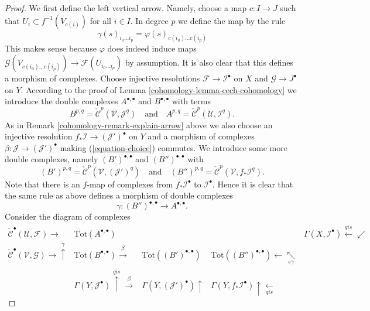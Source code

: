 \begin{proof}

We first define the left vertical arrow. Namely, choose a map
$c : I \to J$ such that $U_i \subset f^{-1}(V_{c(i)})$ for all
$i \in I$. In degree $p$ we define the map by the rule
$$
\gamma(s)_{i_0 \ldots i_p} = \varphi(s)_{c(i_0) \ldots c(i_p)}
$$
This makes sense because $\varphi$ does indeed induce maps
$\mathcal{G}(V_{c(i_0) \ldots c(i_p)}) \to \mathcal{F}(U_{i_0 \ldots i_p})$
by assumption. It is also clear that this defines a morphism of complexes.
Choose injective resolutions
$\mathcal{F} \to \mathcal{I}^\bullet$ on $X$ and
$\mathcal{G} \to J^\bullet$ on $Y$. According to
the proof of Lemma \ref{cohomology-lemma-cech-cohomology} we introduce the double
complexes $A^{\bullet, \bullet}$ and $B^{\bullet, \bullet}$
with terms
$$
B^{p, q} = \check{\mathcal{C}}^p(\mathcal{V}, \mathcal{J}^q)
\quad
\text{and}
\quad
A^{p, q} = \check{\mathcal{C}}^p(\mathcal{U}, \mathcal{I}^q).
$$
As in Remark \ref{cohomology-remark-explain-arrow} above we also choose an
injective resolution
$f_*\mathcal{I} \to (\mathcal{J}')^\bullet$ on $Y$ and a morphism
of complexes $\beta : \mathcal{J} \to (\mathcal{J}')^\bullet$
making (\ref{equation-choice}) commutes. We introduce some more
double complexes, namely $(B')^{\bullet, \bullet}$ and
$(B'')^{\bullet, \bullet}$ with
$$
(B')^{p, q} = \check{\mathcal{C}}^p(\mathcal{V}, (\mathcal{J}')^q)
\quad
\text{and}
\quad
(B'')^{p, q} = \check{\mathcal{C}}^p(\mathcal{V}, f_*\mathcal{I}^q).
$$
Note that there is an $f$-map of complexes from
$f_*\mathcal{I}^\bullet$ to $\mathcal{I}^\bullet$. Hence
it is clear that the same rule as above defines a morphism
of double complexes
$$
\gamma : (B'')^{\bullet, \bullet} \longrightarrow A^{\bullet, \bullet}.
$$
Consider the diagram of complexes
$$
\begin{array}{ccccc}\check{\mathcal{C}}^\bullet(\mathcal{U}, \mathcal{F})
\longrightarrow & \text{Tot}(A^{\bullet, \bullet}) &  &  & \Gamma(X, \mathcal{I}^\bullet) \overset{qis}{\longleftarrow}\swarrow \\ \check{\mathcal{C}}^\bullet(\mathcal{V}, \mathcal{G})
\longrightarrow\overset{\gamma}{\uparrow} & \text{Tot}(B^{\bullet, \bullet}) \overset{\beta}{\longrightarrow} & \text{Tot}((B')^{\bullet, \bullet}) & \text{Tot}((B'')^{\bullet, \bullet}) \longleftarrow\underset{s\gamma}{\nwarrow} &  \\  & \Gamma(Y, \mathcal{J}^\bullet) \overset{qis}{\uparrow}\overset{\beta}{\longrightarrow} & \Gamma(Y, (\mathcal{J}')^\bullet) \uparrow & \Gamma(Y, f_*\mathcal{I}^\bullet) \uparrow\underset{qis}{\longleftarrow} & \end{array}
$$
\end{proof}

